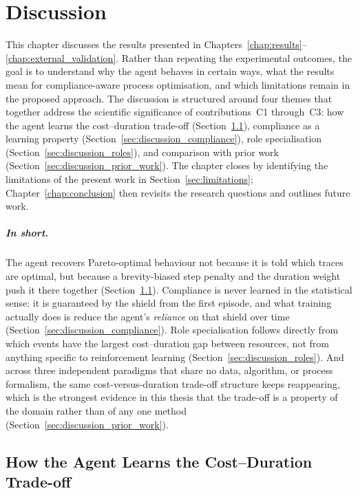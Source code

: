 \chapter{Discussion}
\label{chap:discussion}

This chapter discusses the results presented in Chapters~\ref{chap:results}--\ref{chap:external_validation}. Rather than repeating the experimental outcomes, the goal is to understand why the agent behaves in certain ways, what the results mean for compliance-aware process optimisation, and which limitations remain in the proposed approach. The discussion is structured around four themes that together address the scientific significance of contributions~C1 through~C3: how the agent learns the cost--duration trade-off (Section~\ref{sec:discussion_tradeoff}), compliance as a learning property (Section~\ref{sec:discussion_compliance}), role specialisation (Section~\ref{sec:discussion_roles}), and comparison with prior work (Section~\ref{sec:discussion_prior_work}). The chapter closes by identifying the limitations of the present work in Section~\ref{sec:limitations}; Chapter~\ref{chap:conclusion} then revisits the research questions and outlines future work.

\paragraph{In short.} The agent recovers Pareto-optimal behaviour not because it is told which traces are optimal, but because a brevity-biased step penalty and the duration weight push it there together (Section~\ref{sec:discussion_tradeoff}). Compliance is never learned in the statistical sense: it is guaranteed by the shield from the first episode, and what training actually does is reduce the agent's \emph{reliance} on that shield over time (Section~\ref{sec:discussion_compliance}). Role specialisation follows directly from which events have the largest cost--duration gap between resources, not from anything specific to reinforcement learning (Section~\ref{sec:discussion_roles}). And across three independent paradigms that share no data, algorithm, or process formalism, the same cost-versus-duration trade-off structure keeps reappearing, which is the strongest evidence in this thesis that the trade-off is a property of the domain rather than of any one method (Section~\ref{sec:discussion_prior_work}).

\section{How the Agent Learns the Cost--Duration Trade-off}
\label{sec:discussion_tradeoff}
\label{sec:discussion_reward}
\label{sec:discussion_reward_design}

